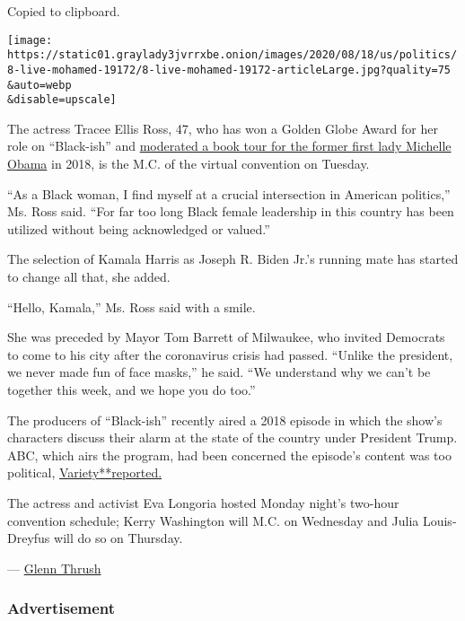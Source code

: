 Copied to clipboard.

\texttt{[image: https://static01.graylady3jvrrxbe.onion/images/2020/08/18/us/politics/8-live-mohamed-19172/8-live-mohamed-19172-articleLarge.jpg?quality=75\\\&auto=webp\\\&disable=upscale]}

The actress Tracee Ellis Ross, 47, who has won a Golden Globe Award for
her role on ``Black-ish'' and
\href{https://www.nytimes3xbfgragh.onion/2018/11/20/books/michelle-obama-tracee-ellis-ross-interview.html}{moderated
a book tour for the former first lady Michelle Obama} in 2018, is the
M.C. of the virtual convention on Tuesday.

``As a Black woman, I find myself at a crucial intersection in American
politics,'' Ms. Ross said. ``For far too long Black female leadership in
this country has been utilized without being acknowledged or valued.''

The selection of Kamala Harris as Joseph R. Biden Jr.'s running mate has
started to change all that, she added.

``Hello, Kamala,'' Ms. Ross said with a smile.

She was preceded by Mayor Tom Barrett of Milwaukee, who invited
Democrats to come to his city after the coronavirus crisis had passed.
``Unlike the president, we never made fun of face masks,'' he said. ``We
understand why we can't be together this week, and we hope you do too.''

The producers of ``Black-ish'' recently aired a 2018 episode in which
the show's characters discuss their alarm at the state of the country
under President Trump. ABC, which airs the program, had been concerned
the episode's content was too political,
\href{https://variety.com/2020/tv/news/black-ish-episode-please-baby-please-released-hulu-shelved-abc-1234730838/}{Variety}\href{https://variety.com/2020/tv/news/black-ish-episode-please-baby-please-released-hulu-shelved-abc-1234730838/}{**}\href{https://variety.com/2020/tv/news/black-ish-episode-please-baby-please-released-hulu-shelved-abc-1234730838/}{reported.}

The actress and activist Eva Longoria hosted Monday night's two-hour
convention schedule; Kerry Washington will M.C. on Wednesday and Julia
Louis-Dreyfus will do so on Thursday.

--- \href{https://www.nytimes3xbfgragh.onion/by/glenn-thrush}{Glenn
Thrush}

\hypertarget{advertisement-4}{%
\subsubsection{Advertisement}\label{advertisement-4}}

